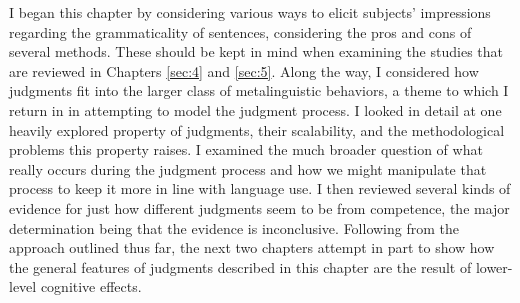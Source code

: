 I began this chapter by considering various ways to elicit subjects' impressions regarding the grammaticality of sentences, considering the pros and cons of several methods. These should be kept in mind when examining the studies that are reviewed in Chapters \ref{sec:4} and \ref{sec:5}. Along the way, I considered how judgments fit into the larger class of metalinguistic behaviors, a theme to which I return in  in attempting to model the judgment process. I looked in detail at one heavily explored property of judgments, their scalability, and the methodological problems this property raises. I examined the much broader question of what really occurs during the judgment process and how we might manipulate that process to keep it more in line with language use. I then reviewed several kinds of evidence for just how different judgments seem to be from competence, the major determination being that the evidence is inconclusive. Following from the approach outlined thus far, the next two chapters attempt in part to show how the general features of judgments described in this chapter are the result of lower-level cognitive effects.